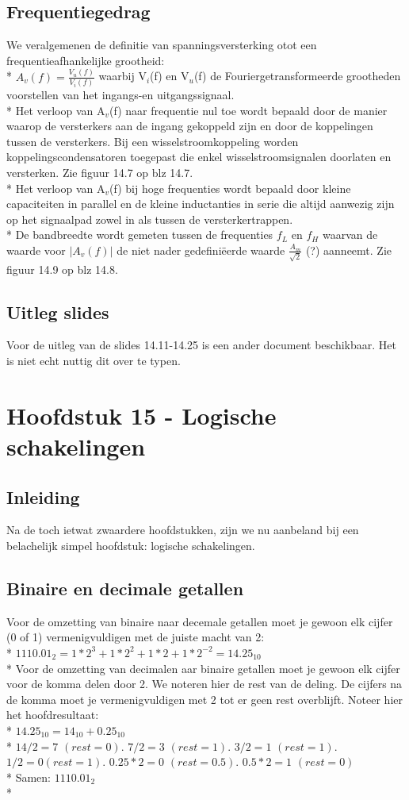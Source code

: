 \documentclass[10pt]{article}
\begin{document}
\subsection{Frequentiegedrag}
We veralgemenen de definitie van spanningsversterking otot een frequentieafhankelijke grootheid:\\*
$A_v(f) = \frac{V_u(f)}{V_i(f)}$ waarbij V$_i$(f) en V$_u$(f) de Fouriergetransformeerde grootheden voorstellen van het ingangs-en uitgangssignaal.\\*
Het verloop van A$_v$(f) naar frequentie nul toe wordt bepaald door de manier waarop de versterkers aan de ingang gekoppeld zijn en door de koppelingen tussen de versterkers. Bij een wisselstroomkoppeling worden koppelingscondensatoren toegepast die enkel wisselstroomsignalen doorlaten en versterken. Zie figuur 14.7 op blz 14.7.\\*
Het verloop van A$_v$(f) bij hoge frequenties wordt bepaald door kleine capaciteiten in parallel en de kleine inductanties in serie die altijd aanwezig zijn op het signaalpad zowel in als tussen de versterkertrappen.\\*
De bandbreedte wordt gemeten tussen de frequenties $f_L$ en $f_H$ waarvan de waarde voor $|A_v(f)|$ de niet nader gedefini\"eerde waarde $\frac{A_m}{\sqrt{2}}$ (?) aanneemt. Zie figuur 14.9 op blz 14.8.
\subsection{Uitleg slides}
Voor de uitleg van de slides 14.11-14.25 is een ander document beschikbaar. Het is niet echt nuttig dit over te typen.
\section{Hoofdstuk 15 - Logische schakelingen}
\subsection{Inleiding}
Na de toch ietwat zwaardere hoofdstukken, zijn we nu aanbeland bij een belachelijk simpel hoofdstuk: logische schakelingen.
\subsection{Binaire en decimale getallen}
Voor de omzetting van binaire naar decemale getallen moet je gewoon elk cijfer (0 of 1) vermenigvuldigen met de juiste macht van 2:\\*
$1110.01_2 = 1*2^3+1*2^2+1*2+1*2^{-2} = 14.25_{10}$\\*
Voor de omzetting van decimalen aar binaire getallen moet je gewoon elk cijfer voor de komma delen door 2. We noteren hier de rest van de deling. De cijfers na de komma moet je vermenigvuldigen met 2 tot er geen rest overblijft. Noteer hier het hoofdresultaat:\\*
$14.25_{10} = 14_{10} + 0.25_{10}$\\*
$14/2 = 7$ $(rest = 0).$ $7/2 = 3$ $(rest = 1).$ $3/2 = 1$ $(rest = 1).$ $1/2 = 0 (rest = 1).$ $0.25*2 = 0$ $(rest = 0.5).$ $0.5*2 = 1$ $(rest = 0)$\\*
Samen: $1110.01_2$\\*
\end{document}
